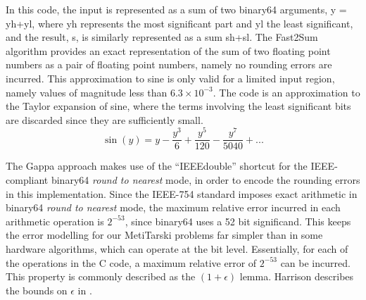\documentclass{fac}
\begin{document}
In this code, the input is represented as a sum of two binary64 arguments, y = yh+yl, where yh represents the most significant part and yl the least significant, and the result, s, is similarly represented as a sum sh+sl. The Fast2Sum algorithm provides an exact representation of the sum of two floating point numbers as a pair of floating point numbers, namely no rounding errors are incurred. This approximation to sine is only valid for a limited input region, namely values of magnitude less than $6.3\times 10^{-3}$. The code is an approximation to the Taylor expansion of sine, where the terms involving the least significant bits are discarded since they are sufficiently small. 
\begin{equation}
    \sin{(y)} = y - \frac{y^3}{6} + \frac{y^5}{120} - \frac{y^7}{5040} + ... 
\end{equation}

The Gappa approach makes use of the ``IEEEdouble'' shortcut for the IEEE-compliant binary64 \textit{round to nearest} mode, in order to encode the rounding errors in this implementation. Since the IEEE-754 standard imposes exact arithmetic in binary64 \textit{round to nearest} mode, the maximum relative error incurred in each arithmetic operation is $2^{-53}$, since binary64 uses a 52 bit significand. This keeps the error modelling for our MetiTarski problems far simpler than in some hardware algorithms, which can operate at the bit level. Essentially, for each of the operations in the C code, a maximum relative error of $2^{-53}$ can be incurred. This property is commonly described as the $(1+\epsilon)$ lemma. Harrison describes the bounds on $\epsilon$ in \cite{harrison2006floating}.
\end{document}
